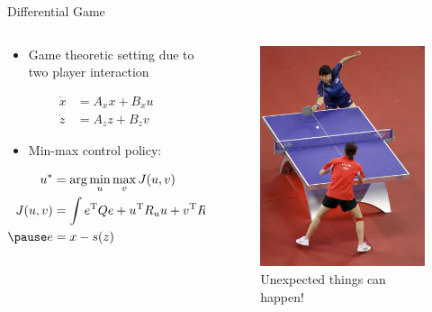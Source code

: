 \documentclass[handout]{beamer}
\begin{document}
%
\begin{frame}{Differential Game}
\begin{columns}
\begin{column}{.49\textwidth}
	\begin{itemize}
	\item Game theoretic setting due to two player interaction
	\end{itemize}
	\begin{equation*}
	\begin{aligned}
	\dot{x} &= A_x x + B_x u \\
	\dot{z} &= A_z z + B_z v
	\end{aligned}
	\end{equation*}
	\begin{itemize}
	\item Min-max control policy:
	\end{itemize}
	\begin{equation*}
	\begin{aligned}
	u^{*} &= \arg\min_{u}\max_{v} J(u,v) \\
	J(u,v) &= \int e^{\mathrm{T}}Qe + u^{\mathrm{T}}R_u u + v^{\mathrm{T}}R_v v \\ \pause
	e &= x - s(z)
	\end{aligned}
	\end{equation*} \pause
\end{column}
\begin{column}{.49\textwidth}
  \begin{figure}
  \center
  \includegraphics[scale=2.0]{table-tennis.jpg}			
  \caption{Unexpected things can happen!}
  \end{figure}
\end{column}
\end{columns}
\end{frame}
%
\end{document}
